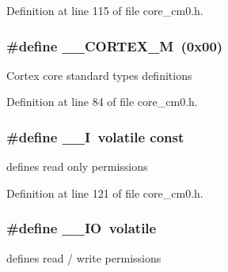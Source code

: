 Definition at line 115 of file core\+\_\+cm0.\+h.

\subsubsection[{\texorpdfstring{\+\_\+\+\_\+\+C\+O\+R\+T\+E\+X\+\_\+M}{__CORTEX_M}}]{\setlength{\rightskip}{0pt plus 5cm}\#define \+\_\+\+\_\+\+C\+O\+R\+T\+E\+X\+\_\+M~(0x00)}\hypertarget{group___c_m_s_i_s__core__definitions_ga63ea62503c88acab19fcf3d5743009e3}{}\label{group___c_m_s_i_s__core__definitions_ga63ea62503c88acab19fcf3d5743009e3}
Cortex core standard types definitions 

Definition at line 84 of file core\+\_\+cm0.\+h.

\subsubsection[{\texorpdfstring{\+\_\+\+\_\+I}{__I}}]{\setlength{\rightskip}{0pt plus 5cm}\#define \+\_\+\+\_\+I~volatile const}\hypertarget{group___c_m_s_i_s__core__definitions_gaf63697ed9952cc71e1225efe205f6cd3}{}\label{group___c_m_s_i_s__core__definitions_gaf63697ed9952cc71e1225efe205f6cd3}
defines \textquotesingle{}read only\textquotesingle{} permissions 

Definition at line 121 of file core\+\_\+cm0.\+h.

\subsubsection[{\texorpdfstring{\+\_\+\+\_\+\+IO}{__IO}}]{\setlength{\rightskip}{0pt plus 5cm}\#define \+\_\+\+\_\+\+IO~volatile}\hypertarget{group___c_m_s_i_s__core__definitions_gaec43007d9998a0a0e01faede4133d6be}{}\label{group___c_m_s_i_s__core__definitions_gaec43007d9998a0a0e01faede4133d6be}
defines \textquotesingle{}read / write\textquotesingle{} permissions 

